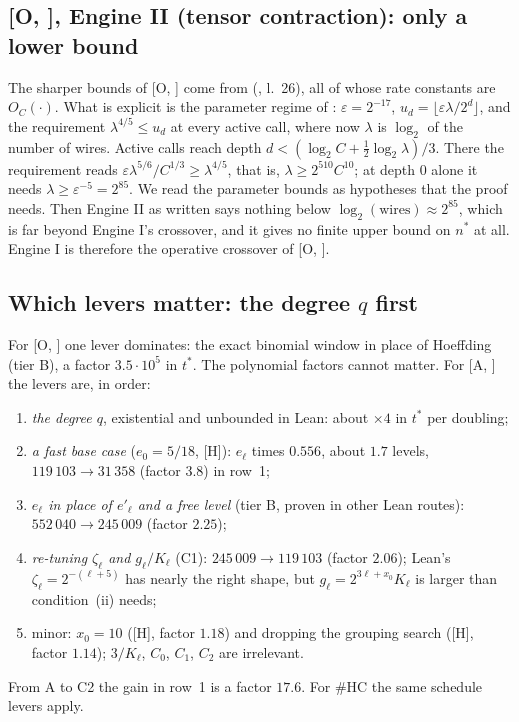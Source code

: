 \documentclass[10pt]{amsart}
\theoremstyle{definition}
\theoremstyle{remark}
\numberwithin{equation}{section}
\newcommand{\A}[1][]{\textup{[A\if\relax\detokenize{#1}\relax\else, #1\fi]}}
\newcommand{\Oa}[1][]{\textup{[O\if\relax\detokenize{#1}\relax\else, #1\fi]}}
\newcommand{\HC}{\#\mathrm{HC}}
\newcommand{\tst}{t^{*}}
\newcommand{\nst}{n^{*}}
\newcommand{\Hh}{\textup{[H]}}
\begin{document}
\subsection{\texorpdfstring{\Oa}{[O]}, Engine II (tensor contraction): only a lower bound}\label{sec:engineII}
The sharper bounds of \Oa{} come from  (,
l.~26), all of whose rate constants are $O_C(\cdot)$. What is explicit is the parameter regime of
: $\varepsilon=2^{-17}$, $u_d=\lfloor\varepsilon\lambda/2^d\rfloor$,
and the requirement $\lambda^{4/5}\le u_d$ at every active call, where now $\lambda$ is
$\log_2$ of the number of wires. Active calls reach depth $d<(\log_2C+\frac12\log_2\lambda)/3$.
There the requirement reads $\varepsilon\lambda^{5/6}/C^{1/3}\ge\lambda^{4/5}$, that is,
$\lambda\ge2^{510}C^{10}$; at depth $0$ alone it needs $\lambda\ge\varepsilon^{-5}=2^{85}$. We read
the parameter bounds as hypotheses that the proof needs. Then Engine II as written says nothing below
$\log_2(\text{wires})\approx2^{85}$, which is far beyond Engine I's crossover, and it gives no
finite upper bound on $\nst$ at all. Engine I is therefore the operative crossover of \Oa.

\subsection{Which levers matter: the degree \texorpdfstring{$q$}{q} first}\label{sec:levers}
For \Oa{} one lever dominates: the exact binomial window in place of Hoeffding (tier B), a factor
$3.5\cdot10^5$ in $\tst$. The polynomial factors cannot matter. For \A{} the levers are, in order:
\begin{enumerate}[label=\textup{(\roman*)}]
\item \emph{the degree $q$}, existential and unbounded in Lean: about $\times4$ in $\tst$ per doubling;
\item \emph{a fast base case} ($e_0=5/18$, \Hh): $e_\ell$ times $0.556$, about $1.7$ levels,
$119\,103\to31\,358$ (factor $3.8$) in row~1;
\item \emph{$e_\ell$ in place of $e'_\ell$ and a free level} (tier B, proven in other Lean routes):
$552\,040\to245\,009$ (factor $2.25$);
\item \emph{re-tuning $\zeta_\ell$ and $g_\ell/K_\ell$} (C1): $245\,009\to119\,103$ (factor $2.06$);
Lean's $\zeta_\ell=2^{-(\ell+5)}$ has nearly the right shape, but $g_\ell=2^{3\ell+x_0}K_\ell$ is
larger than condition~(ii) needs;
\item minor: $x_0=10$ (\Hh, factor $1.18$) and dropping the grouping search (\Hh, factor $1.14$); $3/K_\ell$, $C_0$,
$C_1$, $C_2$ are irrelevant.
\end{enumerate}
From A to C2 the gain in row~1 is a factor $17.6$. For $\HC$ the same schedule levers apply.
\end{document}
